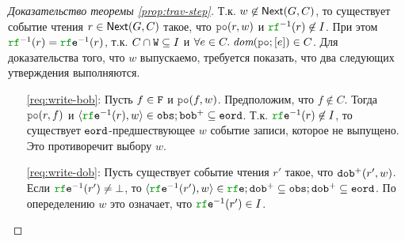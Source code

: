 \begin{proof}[Доказательство теоремы \ref{prop:trav-step}]
  Т.к. $w \not\in {\sf Next}(G, C)$, то существует событие чтения $r \in {\sf Next}(G, C)$ такое, что $\lPO(r, w)$
  и $\lRF^{-1}(r) \nin \IssuedSet$. При этом $\lRF^{-1}(r) = \lRFE^{-1}(r)$, т.к.
  $C \cap {\mathtt{W}} \subseteq I$ и $\forall e \in C. \; \dom{\lPO; [e]} \in C$.
  Для доказательства того, что $w$ выпускаемо, требуется  показать, что два следующих утверждения выполняются.
  \begin{itemize}
    \item[\ref{req:write-bob}:] Пусть $f \in {\mathtt{F}}$ и $\lPO(f, w)$.
      Предположим, что $f \nin C$. Тогда $\lPO(r, f)$ и $\tup{\lRFE^{-1}{(r)}, w} \in \lOBS; \lBOB^{+} \suq \lEORD$.
      Т.к. $\lRFE^{-1}(r) \nin \IssuedSet$, то существует ${\mathtt{eord}}$-предшествующее $w$ событие записи, которое не выпущено.
      Это противоречит выбору $w$.
    \item[\ref{req:write-dob}:] Пусть существует событие чтения $r'$ такое, что ${\mathtt{dob}}^{+}(r', w)$.
      Если $\lRFE^{-1}(r') \neq \bot$, то
      $\tup{\lRFE^{-1}(r'), w} \in \lRFE; \lDOB^{+} \suq \lOBS; \lDOB^{+} \suq \lEORD$. По опеределению $w$ это означает,
      что $\lRFE^{-1}(r') \in \IssuedSet$.
\qedhere
\end{itemize}  
\end{proof}


